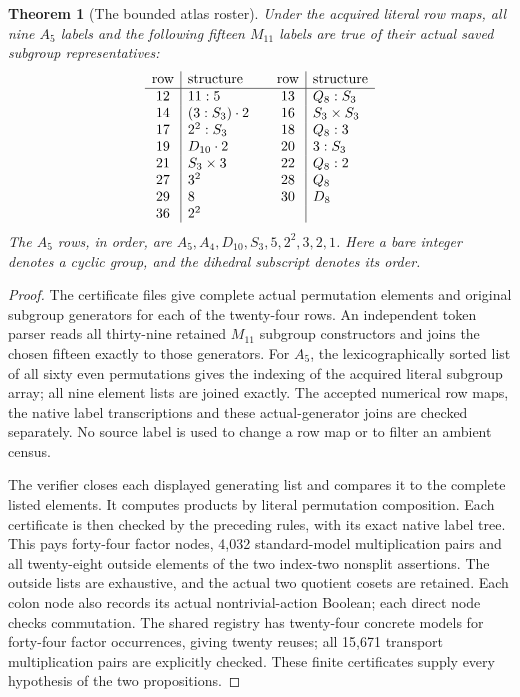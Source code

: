 \documentclass[10pt]{article}
\newtheorem{theorem}{Theorem}
\begin{document}
\begin{theorem}[The bounded atlas roster]
Under the acquired literal row maps, all nine $A_5$ labels and the following
fifteen $M_{11}$ labels are true of their actual saved subgroup representatives:
\[
\begin{array}{c|l@{\qquad}c|l}
\text{row}&\text{structure}&\text{row}&\text{structure}\\\hline
12&11:5&13&Q_8:S_3\\
14&(3:S_3)\cdot2&16&S_3\times S_3\\
17&2^2:S_3&18&Q_8:3\\
19&D_{10}\cdot2&20&3:S_3\\
21&S_3\times3&22&Q_8:2\\
27&3^2&28&Q_8\\
29&8&30&D_8\\
36&2^2&&
\end{array}
\]
The $A_5$ rows, in order, are $A_5,A_4,D_{10},S_3,5,2^2,3,2,1$.
Here a bare integer denotes a cyclic group, and the dihedral subscript
denotes its order.
\end{theorem}
\begin{proof}
The certificate files give complete actual permutation elements and original
subgroup generators for each of the twenty-four rows. An independent token
parser reads all thirty-nine retained $M_{11}$ subgroup constructors and
joins the chosen fifteen exactly to those generators. For $A_5$, the
lexicographically sorted list of all sixty even permutations gives the
indexing of the acquired literal subgroup array; all nine element lists
are joined exactly. The accepted numerical row maps, the native label
transcriptions and these actual-generator joins are checked separately.
No source label is used to change a row map or to filter an ambient census.

The verifier closes each displayed generating list and compares it to the
complete listed elements. It computes products by literal permutation
composition. Each certificate is then checked by the preceding rules,
with its exact native label tree. This pays forty-four factor nodes,
4,032 standard-model multiplication pairs and all twenty-eight outside
elements of the two index-two nonsplit assertions. The outside lists are
exhaustive, and the actual two quotient cosets are retained. Each colon
node also records its actual nontrivial-action Boolean; each direct node
checks commutation. The shared registry has twenty-four concrete models
for forty-four factor occurrences, giving twenty reuses; all 15,671
transport multiplication pairs are explicitly checked. These finite
certificates supply every hypothesis of the two propositions.
\end{proof}
\end{document}
